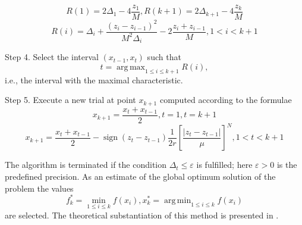 \documentclass[procedia]{easychair}
\DeclareMathOperator*{\argmax}{arg\,max}
\DeclareMathOperator*{\argmin}{arg\,min}
\DeclareMathOperator{\sign}{sign}
\begin{document}
\begin{equation}
\label{step3_1}
R(1)=2\Delta_1-4\dfrac{z_1}{M},R(k+1)=2\Delta_{k+1}-4\dfrac{z_k}{M}
\end{equation}
\begin{equation}
\label{step3_2}
R(i)=\Delta_i+\dfrac{(z_i-z_{i-1})^2}{M^2\Delta_i}-2\dfrac{z_i+z_{i-1}}{M},1<i<k+1
\end{equation}
\par
Step 4. Select the interval \((x_{t-1}, x_t)\) such that
\begin{equation}
\label{step4}
t=\argmax_{1\leqslant i \leqslant k+1}R(i),
\end{equation}
i.e., the interval with the maximal characteristic.
\par
Step 5. Execute a new trial at point \(x_{k+1}\) computed according to the formulae
\begin{displaymath}
x_{k+1}=\dfrac{x_{t}+x_{t-1}}{2},t=1,t=k+1
\end{displaymath}
\begin{equation}
\label{step5}
x_{k+1}=\dfrac{x_{t}+x_{t-1}}{2}-\sign(z_{t}-z_{t-1})\dfrac{1}{2r}\left[\dfrac{|z_{t}-z_{t-1}|}{\mu}\right]^N,1<t<k+1
\end{equation}
\par
The algorithm is terminated if the condition \(\Delta_{t}\leqslant \varepsilon\) is fulfilled;
here \(\varepsilon>0\) is the predefined precision. As an estimate of the global optimum solution of the problem the values
\begin{equation}
f_k^*=\min_{1\leqslant i \leqslant k}f(x_i), x_k^*=\argmin_{1\leqslant i \leqslant k}f(x_i)
\end{equation}
are selected. The theoretical substantiation of this method is presented in \cite{strOptBook}.

\end{document}

